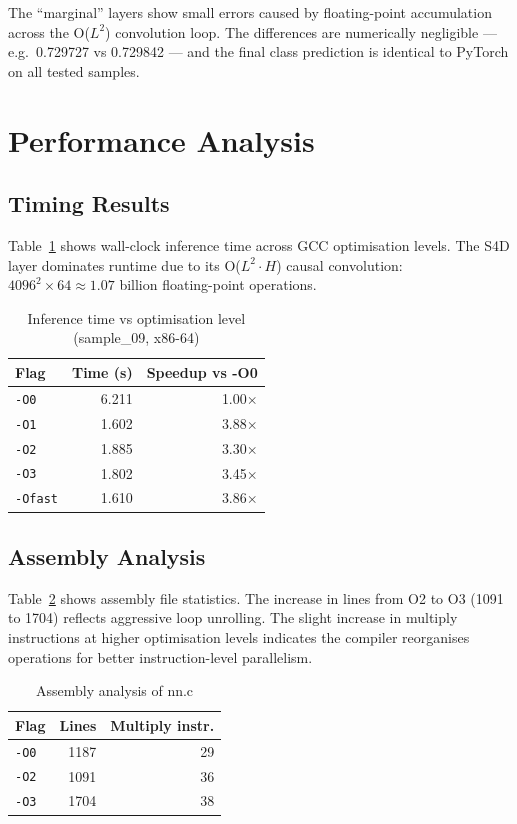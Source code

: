 \documentclass[conference]{IEEEtran}
\begin{document}
The ``marginal'' layers show small errors caused by floating-point
accumulation across the O($L^2$) convolution loop. The differences are
numerically negligible --- e.g.\ 0.729727 vs 0.729842 --- and the final
class prediction is identical to PyTorch on all tested samples.

\section{Performance Analysis}

\subsection{Timing Results}
Table~\ref{tab:timing} shows wall-clock inference time across GCC optimisation
levels. The S4D layer dominates runtime due to its O($L^2 \cdot H$) causal
convolution: $4096^2 \times 64 \approx 1.07$ billion floating-point operations.

\begin{table}[h]
\centering
\caption{Inference time vs optimisation level (sample\_09, x86-64)}
\label{tab:timing}
\begin{tabular}{@{}lrr@{}}
\toprule
Flag & Time (s) & Speedup vs -O0 \\
\midrule
\texttt{-O0} & 6.211 & 1.00$\times$ \\
\texttt{-O1} & 1.602 & 3.88$\times$ \\
\texttt{-O2} & 1.885 & 3.30$\times$ \\
\texttt{-O3} & 1.802 & 3.45$\times$ \\
\texttt{-Ofast} & 1.610 & 3.86$\times$ \\
\bottomrule
\end{tabular}
\end{table}

\subsection{Assembly Analysis}
Table~\ref{tab:asm} shows assembly file statistics. The increase in lines
from O2 to O3 (1091 to 1704) reflects aggressive loop unrolling. The slight
increase in multiply instructions at higher optimisation levels indicates the
compiler reorganises operations for better instruction-level parallelism.

\begin{table}[h]
\centering
\caption{Assembly analysis of nn.c}
\label{tab:asm}
\begin{tabular}{@{}lrr@{}}
\toprule
Flag & Lines & Multiply instr. \\
\midrule
\texttt{-O0} & 1187 & 29 \\
\texttt{-O2} & 1091 & 36 \\
\texttt{-O3} & 1704 & 38 \\
\bottomrule
\end{tabular}
\end{table}
\end{document}
